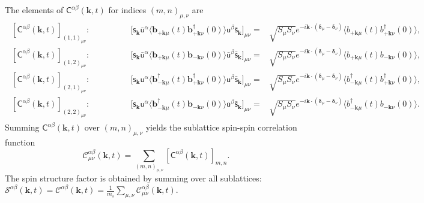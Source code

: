 \documentclass[aps, prx, nofootinbib, superscriptaddress]{revtex4-2}
\newcommand{\kvec}{\mathbf{k}}
\begin{document}
The elements of $\mathsf{C}^{\alpha\beta}(\kvec, t)$ for indices $(m,n)_{\mu,\nu}$ are
\begin{align*}
    \begin{array}{crl}
        {[\mathsf{C}^{\alpha\beta}(\kvec, t)]_{(1,1)_{\mu\nu}}} : \qquad\qquad
        &
        \big[
            \mathsf{s}_{\kvec} \bar{\mathsf{u}}^{\alpha} 
            \langle \mathbf{b}_{+\mathbf{k}\mu}           (t)    \mathbf{b}_{+\mathbf{k}\nu}^{\dagger} (0)    \rangle 
            \mathsf{u}^{\beta} \bar{\mathsf{s}}_{\kvec} 
        \big]_{\mu\nu}
        = &
        \sqrt{S_{\mu}S_{\nu}}e^{-i \kvec \cdot (\bm{\delta}_{\mu} - \bm{\delta}_{\nu})} 
        \big\langle b_{+\mathbf{k}\mu} (t) b_{+\mathbf{k}\nu}^{\dagger} (0) \big\rangle,
        \\
        {[\mathsf{C}^{\alpha\beta}(\kvec, t)]_{(1,2)_{\mu\nu}}} : \qquad\qquad
        &
        \big[
            \mathsf{s}_{\kvec} \bar{\mathsf{u}}^{\alpha} 
            \langle \mathbf{b}_{+\mathbf{k}\mu}           (t)    \mathbf{b}_{-\mathbf{k}\nu}           (0)    \rangle 
            \bar{\mathsf{u}}^{\beta} \bar{\mathsf{s}}_{\kvec}
        \big]_{\mu\nu}
        = & \sqrt{S_{\mu}S_{\nu}}e^{-i \kvec \cdot (\bm{\delta}_{\mu} - \bm{\delta}_{\nu})} 
        \big\langle b_{+\mathbf{k}\mu} (t) b_{-\mathbf{k}\nu} (0) \big\rangle,
        \\
        {[\mathsf{C}^{\alpha\beta}(\kvec, t)]_{(2,1)_{\mu\nu}}} : \qquad\qquad
        & 
        \big[
            \mathsf{s}_{\kvec} \mathsf{u}^{\alpha}
            \langle \mathbf{b}_{-\mathbf{k}\mu}^{\dagger} (t)    \mathbf{b}_{+\mathbf{k}\nu}^{\dagger} (0)    \rangle  
            \mathsf{u}^{\beta} \bar{\mathsf{s}}_{\kvec}  
        \big]_{\mu\nu}
        = & \sqrt{S_{\mu}S_{\nu}}e^{-i \kvec \cdot (\bm{\delta}_{\mu} - \bm{\delta}_{\nu})} 
        \big\langle b_{-\mathbf{k}\mu}^{\dagger} (t) b_{+\mathbf{k}\nu}^{\dagger} (0) \big\rangle,
        \\
        {[\mathsf{C}^{\alpha\beta}(\kvec, t)]_{(2,2)_{\mu\nu}}} : \qquad\qquad
        &
        \big[
            \mathsf{s}_{\kvec} \mathsf{u}^{\alpha}
            \langle \mathbf{b}_{-\mathbf{k}\mu}^{\dagger} (t)    \mathbf{b}_{-\mathbf{k}\nu}           (0)    \rangle
            \bar{\mathsf{u}}^{\beta} \bar{\mathsf{s}}_{\kvec}
        \big]_{\mu\nu}
        = & \sqrt{S_{\mu}S_{\nu}}e^{-i \kvec \cdot (\bm{\delta}_{\mu} - \bm{\delta}_{\nu})} 
        \big\langle b_{-\mathbf{k}\mu}^{\dagger} (t) b_{-\mathbf{k}\nu} (0) \big\rangle.
    \end{array}
\end{align*}
Summing $\mathsf{C}^{\alpha\beta}(\kvec, t)$ over $(m,n)_{\mu,\nu}$ yields the sublattice spin-spin correlation function
\begin{equation}
    \mathcal{C}_{\mu\nu}^{\alpha\beta} (\kvec, t) = \sum_{(m,n)_{\mu,\nu}} [\mathsf{C}^{\alpha\beta}(\kvec, t)]_{m,n}.
\end{equation}
The spin structure factor is obtained by summing over all sublattices: $\mathcal{S}^{\alpha\beta} (\mathbf{k}, t) = \mathcal{C}^{\alpha\beta} (\kvec, t) = \frac{1}{m_s} \sum_{\mu,\nu} \mathcal{C}_{\mu\nu}^{\alpha\beta} (\kvec, t)$.
\end{document}
